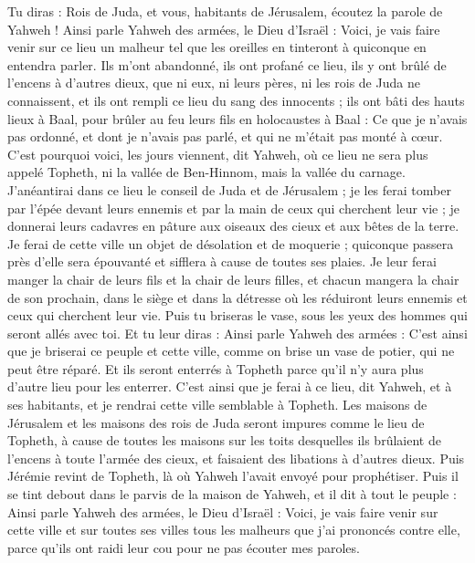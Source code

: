\begin{multicols}{2}
Tu diras : Rois de Juda, et vous, habitants de Jérusalem, écoutez la parole de Yahweh ! Ainsi parle Yahweh des armées, le Dieu d'Israël : Voici, je vais faire venir sur ce lieu un malheur tel que les oreilles en tinteront à quiconque en entendra parler.
Ils m'ont abandonné, ils ont profané ce lieu, ils y ont brûlé de l'encens à d'autres dieux, que ni eux, ni leurs pères, ni les rois de Juda ne connaissent, et ils ont rempli ce lieu du sang des innocents ;
ils ont bâti des hauts lieux à Baal, pour brûler au feu leurs fils en holocaustes à Baal : Ce que je n'avais pas ordonné, et dont je n'avais pas parlé, et qui ne m'était pas monté à cœur.
C'est pourquoi voici, les jours viennent, dit Yahweh, où ce lieu ne sera plus appelé Topheth, ni la vallée de Ben-Hinnom, mais la vallée du carnage.
J'anéantirai dans ce lieu le conseil de Juda et de Jérusalem ; je les ferai tomber par l'épée devant leurs ennemis et par la main de ceux qui cherchent leur vie ; je donnerai leurs cadavres en pâture aux oiseaux des cieux et aux bêtes de la terre.
Je ferai de cette ville un objet de désolation et de moquerie ; quiconque passera près d'elle sera épouvanté et sifflera à cause de toutes ses plaies.
Je leur ferai manger la chair de leurs fils et la chair de leurs filles, et chacun mangera la chair de son prochain, dans le siège et dans la détresse où les réduiront leurs ennemis et ceux qui cherchent leur vie.
Puis tu briseras le vase, sous les yeux des hommes qui seront allés avec toi.
Et tu leur diras : Ainsi parle Yahweh des armées : C'est ainsi que je briserai ce peuple et cette ville, comme on brise un vase de potier, qui ne peut être réparé. Et ils seront enterrés à Topheth parce qu'il n'y aura plus d'autre lieu pour les enterrer.
C'est ainsi que je ferai à ce lieu, dit Yahweh, et à ses habitants, et je rendrai cette ville semblable à Topheth.
Les maisons de Jérusalem et les maisons des rois de Juda seront impures comme le lieu de Topheth, à cause de toutes les maisons sur les toits desquelles ils brûlaient de l'encens à toute l'armée des cieux, et faisaient des libations à d'autres dieux.
Puis Jérémie revint de Topheth, là où Yahweh l'avait envoyé pour prophétiser. Puis il se tint debout dans le parvis de la maison de Yahweh, et il dit à tout le peuple :
Ainsi parle Yahweh des armées, le Dieu d'Israël : Voici, je vais faire venir sur cette ville et sur toutes ses villes tous les malheurs que j'ai prononcés contre elle, parce qu'ils ont raidi leur cou pour ne pas écouter mes paroles.

\end{multicols}
